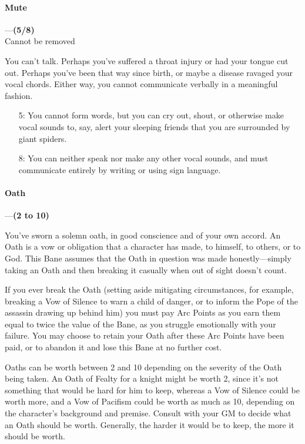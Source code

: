 \documentclass[oneside,11pt,english]{book}
\begin{document}
\paragraph{\label{bane:Mute}Mute}---\quad\textbf{(5/8) }\\
{Cannot be removed}\par
You can't talk. Perhaps you've suffered a throat injury or had your tongue cut out. Perhaps you've been 
that way since birth, or maybe a disease ravaged your vocal chords. Either way, you cannot communicate verbally in a meaningful fashion.
\begin{itemize}
	\item [5:] You cannot form words, but you can cry out, shout, or otherwise make vocal sounds to, say, alert your sleeping friends that you are surrounded by giant spiders.
	\item [8:] You can neither speak nor make any other vocal sounds, and must communicate entirely by writing or using sign language.
\end{itemize}
\paragraph{\label{bane:Oath}Oath}---\quad\textbf{(2 to 10) }\par
You've sworn a solemn oath, in good conscience and of your own accord. An Oath is a vow or obligation 
that a character has made, to himself, to others, or to God. This Bane assumes that the Oath in question 
was made honestly—simply taking an Oath and then breaking it casually when out of sight doesn't count. 


If you ever break the Oath (setting aside mitigating circumstances, for example, breaking a Vow of 
Silence to warn a child of danger, or to inform the Pope of the assassin drawing up behind him) you must 
pay Arc Points as you earn them equal to twice the value of the Bane, as you struggle emotionally with 
your failure. You may choose to retain your Oath after these Arc Points have been paid, or to abandon it 
and lose this Bane at no further cost. 


Oaths can be worth between 2 and 10 depending on the severity of the Oath being taken. An Oath of 
Fealty for a knight might be worth 2, since it's not something that would be hard for him to keep, whereas 
a Vow of Silence could be worth more, and a Vow of Pacifism could be worth as much as 10, depending 
on the character's background and premise. Consult with your GM to decide what an Oath should be 
worth. Generally, the harder it would be to keep, the more it should be worth. 
\end{document}
